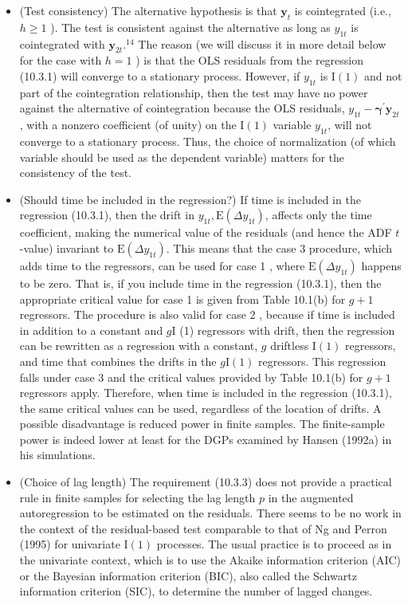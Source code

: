 \documentclass[10pt]{article}
\begin{document}
\begin{itemize}
  \item (Test consistency) The alternative hypothesis is that $\mathbf{y}_{t}$ is cointegrated (i.e., $h \geq 1$ ). The test is consistent against the alternative as long as $y_{1 t}$ is cointegrated with $\mathbf{y}_{2 t} .{ }^{14}$ The reason (we will discuss it in more detail below for the case with $h=1$ ) is that the OLS residuals from the regression (10.3.1) will converge to a stationary process. However, if $y_{1 t}$ is $\mathrm{I}(1)$ and not part of the cointegration relationship, then the test may have no power against the alternative of cointegration because the OLS residuals, $y_{1 t}-\boldsymbol{\gamma}^{\prime} \mathbf{y}_{2 t}$, with a nonzero coefficient (of unity) on the $\mathrm{I}(1)$ variable $y_{1 t}$, will not converge to a stationary process. Thus, the choice of normalization (of which variable should be used as the dependent variable) matters for the consistency of the test.
  \item (Should time be included in the regression?) If time is included in the regression (10.3.1), then the drift in $y_{1 t}, \mathrm{E}\left(\Delta y_{1 t}\right)$, affects only the time coefficient, making the numerical value of the residuals (and hence the ADF $t$-value) invariant to $\mathrm{E}\left(\Delta y_{1 t}\right)$. This means that the case 3 procedure, which adds time to the regressors, can be used for case 1 , where $\mathrm{E}\left(\Delta y_{1 t}\right)$ happens to be zero. That is, if you include time in the regression (10.3.1), then the appropriate critical value for case 1 is given from Table 10.1(b) for $g+1$ regressors. The procedure is also valid for case 2 , because if time is included in addition to a constant and $g \mathrm{I}$ (1) regressors with drift, then the regression can be rewritten as a regression with a constant, $g$ driftless $\mathrm{I}(1)$ regressors, and time that combines the drifts in the $g \mathrm{I}(1)$ regressors. This regression falls under case 3 and the critical values provided by Table 10.1(b) for $g+1$ regressors apply. Therefore, when time is included in the regression (10.3.1), the same critical values can be used, regardless of the location of drifts. A possible disadvantage is reduced power in finite samples. The finite-sample power is indeed lower at least for the DGPs examined by Hansen (1992a) in his simulations.
  \item (Choice of lag length) The requirement (10.3.3) does not provide a practical rule in finite samples for selecting the lag length $p$ in the augmented autoregression to be estimated on the residuals. There seems to be no work in the context of the residual-based test comparable to that of Ng and Perron (1995) for univariate $\mathrm{I}(1)$ processes. The usual practice is to proceed as in the univariate context, which is to use the Akaike information criterion (AIC) or the Bayesian information criterion (BIC), also called the Schwartz information criterion (SIC), to determine the number of lagged changes.
\end{itemize}
\end{document}
